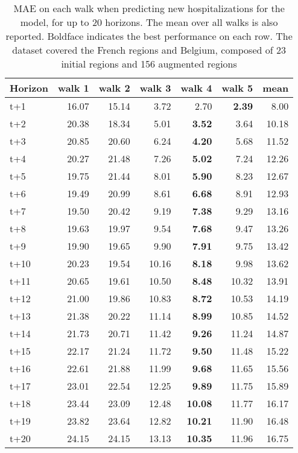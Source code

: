 \begin{table}[H]
\centering
\caption{MAE on each walk when predicting new hospitalizations for the model, for up to 20 horizons. The mean over all walks is also reported. Boldface indicates the best performance on each row. The dataset covered the French regions and Belgium, composed of 23 initial regions and 156 augmented regions }
\label{tab:MAE_walk_encoder_decoder}
\begin{tabular}{lrrrrrr}
\toprule
Horizon &  walk 1 &  walk 2 &  walk 3 &  walk 4 &  walk 5 &  mean \\
\midrule
t+1  & 16.07  & 15.14  & 3.72  & 2.70  & \textbf{2.39}  & 8.00  \\
t+2  & 20.38  & 18.34  & 5.01  & \textbf{3.52}  & 3.64  & 10.18  \\
t+3  & 20.85  & 20.60  & 6.24  & \textbf{4.20}  & 5.68  & 11.52  \\
t+4  & 20.27  & 21.48  & 7.26  & \textbf{5.02}  & 7.24  & 12.26  \\
t+5  & 19.75  & 21.44  & 8.01  & \textbf{5.90}  & 8.23  & 12.67  \\
t+6  & 19.49  & 20.99  & 8.61  & \textbf{6.68}  & 8.91  & 12.93  \\
t+7  & 19.50  & 20.42  & 9.19  & \textbf{7.38}  & 9.29  & 13.16  \\
t+8  & 19.63  & 19.97  & 9.54  & \textbf{7.68}  & 9.47  & 13.26  \\
t+9  & 19.90  & 19.65  & 9.90  & \textbf{7.91}  & 9.75  & 13.42  \\
t+10  & 20.23  & 19.54  & 10.16  & \textbf{8.18}  & 9.98  & 13.62  \\
t+11  & 20.65  & 19.61  & 10.50  & \textbf{8.48}  & 10.32  & 13.91  \\
t+12  & 21.00  & 19.86  & 10.83  & \textbf{8.72}  & 10.53  & 14.19  \\
t+13  & 21.38  & 20.22  & 11.14  & \textbf{8.99}  & 10.85  & 14.52  \\
t+14  & 21.73  & 20.71  & 11.42  & \textbf{9.26}  & 11.24  & 14.87  \\
t+15  & 22.17  & 21.24  & 11.72  & \textbf{9.50}  & 11.48  & 15.22  \\
t+16  & 22.61  & 21.88  & 11.99  & \textbf{9.68}  & 11.65  & 15.56  \\
t+17  & 23.01  & 22.54  & 12.25  & \textbf{9.89}  & 11.75  & 15.89  \\
t+18  & 23.44  & 23.09  & 12.48  & \textbf{10.08}  & 11.77  & 16.17  \\
t+19  & 23.82  & 23.64  & 12.82  & \textbf{10.21}  & 11.90  & 16.48  \\
t+20  & 24.15  & 24.15  & 13.13  & \textbf{10.35}  & 11.96  & 16.75  \\

\bottomrule
\end{tabular}
\end{table}
